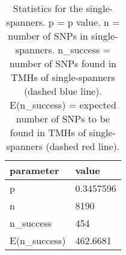 \begin{table}

\caption{\label{tab:snp_stats_per_spanner_single}Statistics for the single-spanners. p = p value. n = number of SNPs in single-spanners. n\_success = number of SNPs found in TMHs of single-spanners (dashed blue line). E(n\_success) = expected number of SNPs to be found in TMHs of single-spanners  (dashed red line). }
\centering
\begin{tabular}[t]{l|l}
\hline
parameter & value\\
\hline
p & 0.3457596\\
\hline
n & 8190\\
\hline
n\_success & 454\\
\hline
E(n\_success) & 462.6681\\
\hline
\end{tabular}
\end{table}